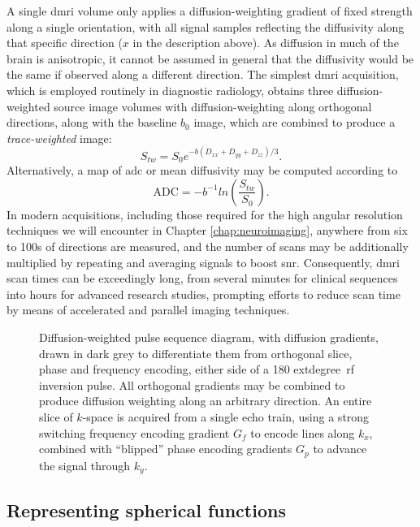\documentclass[12pt,phd,a4paper,twoside]{ucl_thesis}
\begin{document}
A single \gls{dmri} volume only applies a diffusion-weighting gradient of fixed strength along a single orientation, with all signal samples reflecting the diffusivity along that specific direction ($x$ in the description above).
As diffusion in much of the brain is anisotropic, it cannot be assumed in general that the diffusivity would be the same if observed along a different direction.
The simplest \gls{dmri} acquisition, which is employed routinely in diagnostic radiology, obtains three diffusion-weighted source image volumes with diffusion-weighting along orthogonal directions, along with the baseline $b_0$ image, which are combined to produce a \textit{trace-weighted} image:
\begin{equation}
  S_{tw} = S_0 e^{-b(D_{xx} + D_{yy} + D_{zz})/3}. \label{eq:trace}
\end{equation}
Alternatively, a map of \gls{adc} or mean diffusivity may be computed according to
\begin{equation}
  \text{ADC} = -b^{-1} ln (\frac{S_{tw}}{S_0}). \label{eq:adc}
\end{equation}
In modern acquisitions, including those required for the high angular resolution techniques we will encounter in Chapter \ref{chap:neuroimaging}, anywhere from six to 100s of directions are measured, and the number of scans may be additionally multiplied by repeating and averaging signals to boost \gls{snr}.
Consequently, \gls{dmri} scan times can be exceedingly long, from several minutes for clinical sequences into hours for advanced research studies, prompting efforts to reduce scan time by means of accelerated and parallel imaging techniques.

\begin{figure}[htb!]
  
  \caption[Diffusion-weighted EPI pulse sequence diagram]{Diffusion-weighted  pulse sequence diagram, with diffusion gradients, drawn in dark grey to differentiate them from orthogonal slice, phase and frequency encoding, either side of a 180	extdegree\ \gls{rf} inversion pulse. All orthogonal gradients may be combined to produce diffusion weighting along an arbitrary direction. An entire slice of $k$-space is acquired from a single echo train, using a strong switching frequency encoding gradient $G_f$ to encode lines along $k_x$, combined with ``blipped'' phase encoding gradients $G_p$ to advance the signal through $k_y$.}
  \label{fig:dwepi}
\end{figure}

\subsection{Representing spherical functions}
\label{sec:sh}
\end{document}
